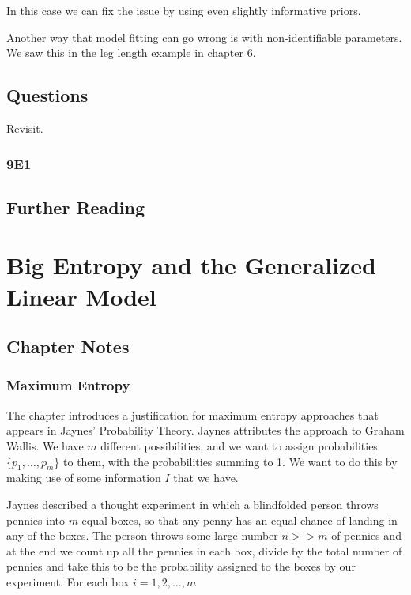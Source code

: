 \documentclass[
]{book}
\begin{document}
In this case we can fix the issue by using even slightly informative priors.

Another way that model fitting can go wrong is with non-identifiable parameters. We saw this in the leg length example in chapter 6.

\hypertarget{questions-8}{%
\section{Questions}\label{questions-8}}

Revisit.

\hypertarget{e1-7}{%
\subsection*{9E1}\label{e1-7}}

\hypertarget{further-reading-7}{%
\section*{Further Reading}\label{further-reading-7}}

\hypertarget{big_entropy}{%
\chapter{Big Entropy and the Generalized Linear Model}\label{big_entropy}}

\hypertarget{chapter-notes-9}{%
\section{Chapter Notes}\label{chapter-notes-9}}

\hypertarget{maximum-entropy}{%
\subsection*{Maximum Entropy}\label{maximum-entropy}}

The chapter introduces a justification for maximum entropy approaches that appears in Jaynes' Probability Theory. Jaynes attributes the approach to Graham Wallis. We have \(m\) different possibilities, and we want to assign probabilities \(\{ p_1, \dots, p_m \}\) to them, with the probabilities summing to 1. We want to do this by making use of some information \(I\) that we have.

Jaynes described a thought experiment in which a blindfolded person throws pennies into \(m\) equal boxes, so that any penny has an equal chance of landing in any of the boxes. The person throws some large number \(n >> m\) of pennies and at the end we count up all the pennies in each box, divide by the total number of pennies and take this to be the probability assigned to the boxes by our experiment. For each box \(i = 1,2,\dots,m\)
\end{document}
